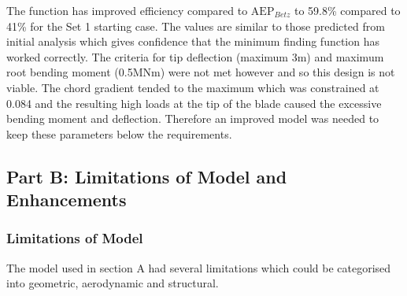 \documentclass[11pt]{article}
\begin{document}
The function has improved efficiency compared to $\text{AEP}_{Betz}$ to 59.8\% compared to 41\% for the Set 1 starting case. The values are similar to those predicted from initial analysis which gives confidence that the minimum finding function has worked correctly. The criteria for tip deflection  (maximum 3m) and maximum root bending moment (0.5MNm) were not met however and so this design is not viable. The chord gradient tended to the maximum which was constrained at 0.084 and the resulting high loads at the tip of the blade caused the excessive bending moment and deflection. Therefore an improved model was needed to keep these parameters below the requirements.


\FloatBarrier
\subsection{Part B: Limitations of Model and Enhancements}

\subsubsection{Limitations of Model}
The model used in section A had several limitations which could be categorised into geometric, aerodynamic and structural. \\
\end{document}
